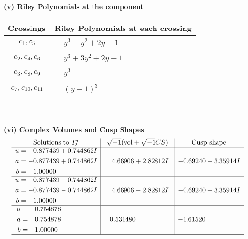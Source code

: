 \documentclass[1p]{elsarticle_modified}
\theoremstyle{definition}
\newcommand{\I}{\sqrt{-1}}
\begin{document}
\newpage\renewcommand{\arraystretch}{1}
\flushleft \textbf{(v) Riley Polynomials at the component}\newline \\
\begin{tabular}{m{50pt}|m{274pt}}
Crossings & \hspace{64pt}Riley Polynomials at each crossing \\
\hline $$\begin{aligned}c_{1},c_{5}\end{aligned}$$&$\begin{aligned}
&y^3- y^2+2 y-1
\end{aligned}$\\
\hline $$\begin{aligned}c_{2},c_{4},c_{6}\end{aligned}$$&$\begin{aligned}
&y^3+3 y^2+2 y-1
\end{aligned}$\\
\hline $$\begin{aligned}c_{3},c_{8},c_{9}\end{aligned}$$&$\begin{aligned}
&y^3
\end{aligned}$\\
\hline $$\begin{aligned}c_{7},c_{10},c_{11}\end{aligned}$$&$\begin{aligned}
&(y-1)^3
\end{aligned}$\\
\hline
\end{tabular}\\~\\
\newpage\flushleft \textbf{(vi) Complex Volumes and Cusp Shapes}
$$\begin{array}{c|c|c}  
\text{Solutions to }I^u_{2}& \I (\text{vol} + \sqrt{-1}CS) & \text{Cusp shape}\\
 \hline 
\begin{aligned}
u &= -0.877439 + 0.744862 I \\
a &= -0.877439 + 0.744862 I \\
b &= \phantom{-}1.00000\phantom{ +0.000000I}\end{aligned}
 & \phantom{-}4.66906 + 2.82812 I & -0.69240 - 3.35914 I \\ \hline\begin{aligned}
u &= -0.877439 - 0.744862 I \\
a &= -0.877439 - 0.744862 I \\
b &= \phantom{-}1.00000\phantom{ +0.000000I}\end{aligned}
 & \phantom{-}4.66906 - 2.82812 I & -0.69240 + 3.35914 I \\ \hline\begin{aligned}
u &= \phantom{-}0.754878\phantom{ +0.000000I} \\
a &= \phantom{-}0.754878\phantom{ +0.000000I} \\
b &= \phantom{-}1.00000\phantom{ +0.000000I}\end{aligned}
 & \phantom{-}0.531480\phantom{ +0.000000I} & -1.61520\phantom{ +0.000000I}\\
 \hline 
 \end{array}$$\newpage
\end{document}
